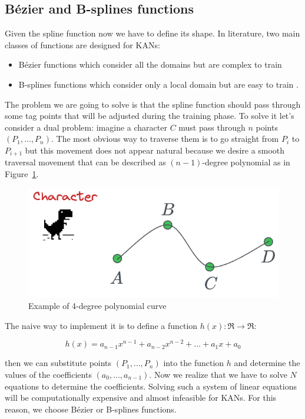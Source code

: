 \subsection{Bézier and B-splines functions}
Given the spline function now we have to define its shape. In literature, two main classes of functions are designed for KANs:
\begin{itemize}
    \item Bézier functions which consider all the domains but are complex to train \cite{bezier}
    \item B-splines functions which consider only a local domain but are easy to train \cite{kan_intro}.
\end{itemize}

The problem we are going to solve is that the spline function should pass through some tag points that will be adjusted during the training phase. To solve it let's consider a dual problem: imagine a character $C$ must pass through $n$ points $(P_1, \dots,P_n)$. The most obvious way to traverse them is to go straight from $P_i$ to $P_{i+1}$ but this movement does not appear natural because we desire a smooth traversal movement that can be described as $(n-1)$-degree polynomial as in Figure~\ref{fig:bezier}.  
\begin{figure}[H]
    \centering
    \includegraphics[width=0.5\linewidth]{Images/bezier.png}
    \caption{Example of 4-degree polynomial curve}
    \label{fig:bezier}
\end{figure}

The naive way to implement it is to define a function $h(x): \Re \to \Re$:

$$h(x) = a_{n-1}x^{n-1} + a_{n-2}x^{n-2} + \dots + a_1x +a_0 $$

then we can substitute points $(P_1, \dots,P_n)$ into the function $h$ and determine the values of the coefficients $(a_0, \dots,a_{n-1})$. Now we realize that we have to solve $N$ equations to determine the coefficients. Solving such a system of linear equations will be computationally expensive and almost infeasible for KANs. For this reason, we choose Bézier or B-splines functions.

